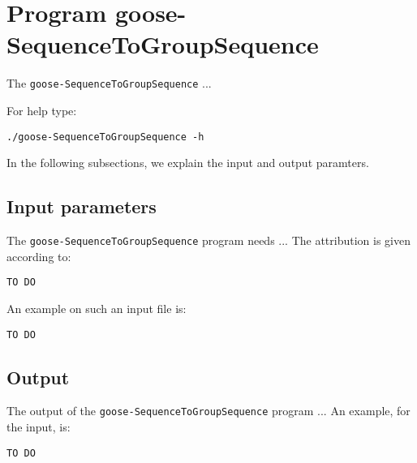 \section{Program goose-SequenceToGroupSequence}
The \texttt{goose-SequenceToGroupSequence} ...

For help type:
\begin{lstlisting}
./goose-SequenceToGroupSequence -h
\end{lstlisting}
In the following subsections, we explain the input and output paramters.

\subsection*{Input parameters}

The \texttt{goose-SequenceToGroupSequence} program needs ...
The attribution is given according to:
\begin{lstlisting}
TO DO
\end{lstlisting}

An example on such an input file is:
\begin{lstlisting}
TO DO
\end{lstlisting}

\subsection*{Output}
The output of the \texttt{goose-SequenceToGroupSequence} program ...
An example, for the input, is:
\begin{lstlisting}
TO DO
\end{lstlisting}
